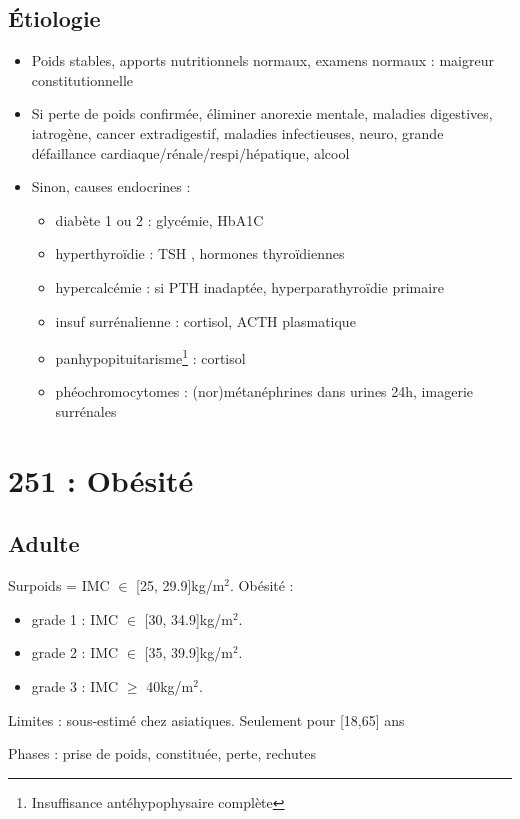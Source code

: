 \documentclass[11pt]{article}
\begin{document}
\subsection{Étiologie}
\label{sec:org40f9133}
\begin{itemize}
\item Poids stables, apports nutritionnels normaux, examens normaux :  maigreur
constitutionnelle
\item Si perte de poids confirmée, éliminer anorexie mentale, maladies digestives,
iatrogène, cancer extradigestif, maladies infectieuses, neuro, grande
défaillance cardiaque/rénale/respi/hépatique, alcool
\item Sinon, causes endocrines :
\begin{itemize}
\item diabète 1 ou 2 : glycémie, HbA1C
\item hyperthyroïdie : TSH \dec\dec, hormones thyroïdiennes \inc
\item hypercalcémie : si \gls{PTH} inadaptée, hyperparathyroïdie primaire
\item insuf surrénalienne : cortisol, ACTH plasmatique
\item panhypopituitarisme\footnote{Insuffisance antéhypophysaire complète} : cortisol \dec
\item phéochromocytomes : (nor)métanéphrines dans urines 24h, imagerie surrénales
\end{itemize}
\end{itemize}
\section{251 : Obésité}
\label{sec:orgf32d4b1}
\subsection{Adulte}
\label{sec:org4cb80c9}
Surpoids = IMC \(\in\) [25, 29.9]kg/m\(^{\text{2}}\). Obésité :
\begin{itemize}
\item grade 1 : IMC \(\in\) [30, 34.9]kg/m\(^{\text{2}}\).
\item grade 2 : IMC \(\in\) [35, 39.9]kg/m\(^{\text{2}}\).
\item grade 3 : IMC \(\ge\) 40kg/m\(^{\text{2}}\).
\end{itemize}

Limites : sous-estimé chez asiatiques. Seulement pour [18,65] ans

Phases : prise de poids, constituée, perte, rechutes
\end{document}
